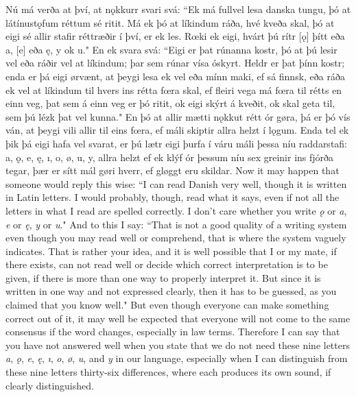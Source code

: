 \begin{paracol}{2}
    Nú má verða at því, at nǫkkurr svari svá: ``Ek má fullvel lesa danska tungu, þó at látínustǫfum réttum sé ritit. Má ek þó at líkindum ráða, hvé kveða skal, þó at eigi sé allir stafir réttræðir í því, er ek les. Rœki ek eigi, hvárt þú rítr [ǫ] þítt eða a, [e] eða ę, y ok u." En ek svara svá: ``Eigi er þat rúnanna kostr, þó at þú lesir vel eða ráðir vel at líkindum; þar sem rúnar vísa óskyrt. Heldr er þat þínn kostr; enda er þá eigi ørvænt, at þeygi lesa ek vel eða mínn maki, ef sá finnsk, eða ráða ek vel at líkindum til hvers ins rétta fœra skal, ef fleiri vega má fœra til rétts en einn veg, þat sem á einn veg er þó ritit, ok eigi skýrt á kveðit, ok skal geta til, sem þú lézk þat vel kunna." En þó at allir mætti nǫkkut rétt ór gøra, þá er þó vís ván, at þeygi vili allir til eins fœra, ef máli skiptir allra helzt í lǫgum. Enda tel ek þik þá eigi hafa vel svarat, er þú lætr eigi þurfa í váru máli þessa níu raddarstafi: a, ǫ, e, ę, ı, o, ø, u, y, allra helzt ef ek klýf ór þessum níu sex greinir ins fjórða tegar, þær er sítt mál gøri hverr, ef gløggt eru skildar.
    \switchcolumn
    Now it may happen that someone would reply this wise: ``I can read Danish very well, though it is written in Latin letters. I would probably, though, read what it says, even if not all the letters in what I read are spelled correctly. I don't care whether you write \textit{ǫ} or \textit{a}, \textit{e} or \textit{ę}, \textit{y} or \textit{u}." And to this I say: ``That is not a good quality of a writing system even though you may read well or comprehend, that is where the system vaguely indicates. That is rather your idea, and it is well possible that I or my mate, if there exists, can not read well or decide which correct interpretation is to be given, if there is more than one way to properly interpret it. But since it is written in one way and not expressed clearly, then it has to be guessed, as you claimed that you know well." But even though everyone can make something correct out of it, it may well be expected that everyone will not come to the same consensus if the word changes, especially in law terms. Therefore I can say that you have not answered well when you state that we do not need these nine letters \textit{a}, \textit{ǫ}, \textit{e}, \textit{ę}, \textit{ı}, \textit{o}, \textit{ø}, \textit{u}, and \textit{y} in our language, especially when I can distinguish from these nine letters thirty-six differences, where each produces its own sound, if clearly distinguished.
\end{paracol}
